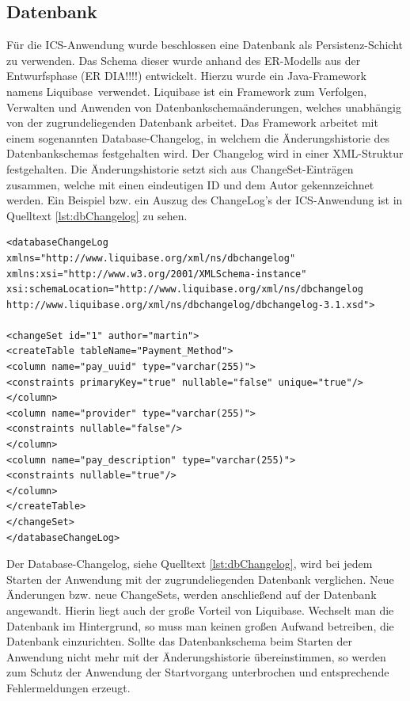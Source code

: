\subsection{Datenbank} \label{umsetzung:backend:datenbank}
Für die \ac{ICS}-Anwendung wurde beschlossen eine Datenbank als Persistenz-Schicht zu verwenden. Das Schema dieser wurde anhand des ER-Modells aus der Entwurfsphase (ER DIA!!!!) entwickelt. Hierzu wurde ein Java-Framework namens \glqq Liquibase\grqq \, verwendet.\autocite{Liquibase} Liquibase ist ein Framework zum Verfolgen, Verwalten und Anwenden von Datenbankschemaänderungen, welches unabhängig von der zugrundeliegenden Datenbank arbeitet. Das Framework arbeitet mit einem sogenannten \glqq Database-Changelog\grqq, in welchem die Änderungshistorie des Datenbankschemas festgehalten wird. Der Changelog wird in einer XML-Struktur festgehalten. Die Änderungshistorie setzt sich aus \glqq ChangeSet\grqq-Einträgen zusammen, welche mit einen eindeutigen \ac{ID} und dem Autor gekennzeichnet werden. Ein Beispiel bzw. ein Auszug des ChangeLog's der \ac{ICS}-Anwendung ist in Quelltext \ref{lst:dbChangelog} zu sehen.

\begin{lstlisting}[caption={Database-Changelog Liquibase}, label={lst:dbChangelog}]
<databaseChangeLog
xmlns="http://www.liquibase.org/xml/ns/dbchangelog"
xmlns:xsi="http://www.w3.org/2001/XMLSchema-instance"
xsi:schemaLocation="http://www.liquibase.org/xml/ns/dbchangelog   
http://www.liquibase.org/xml/ns/dbchangelog/dbchangelog-3.1.xsd">

<changeSet id="1" author="martin">
<createTable tableName="Payment_Method">
<column name="pay_uuid" type="varchar(255)">
<constraints primaryKey="true" nullable="false" unique="true"/>
</column>
<column name="provider" type="varchar(255)">
<constraints nullable="false"/>
</column>
<column name="pay_description" type="varchar(255)">
<constraints nullable="true"/>
</column>
</createTable>
</changeSet>
</databaseChangeLog>
\end{lstlisting}

Der Database-Changelog, siehe Quelltext \ref{lst:dbChangelog}, wird bei jedem Starten der Anwendung mit der zugrundeliegenden Datenbank verglichen. Neue Änderungen bzw. neue ChangeSets, werden anschließend auf der Datenbank angewandt. Hierin liegt auch der große Vorteil von Liquibase. Wechselt man die Datenbank im Hintergrund, so muss man keinen großen Aufwand betreiben, die Datenbank einzurichten. Sollte das Datenbankschema beim Starten der Anwendung nicht mehr mit der Änderungshistorie übereinstimmen, so werden zum Schutz der Anwendung der Startvorgang unterbrochen und entsprechende Fehlermeldungen erzeugt.

